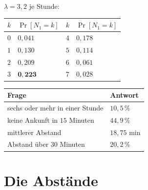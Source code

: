\begin{merksatz}
$\lambda = 3{,}2$ je Stunde:

\begin{center}
{\small
\renewcommand{\arraystretch}{1.46}
\begin{tabular}{@{}P{1.6cm}P{2.2cm}P{1.6cm}P{2.2cm}@{}}
\toprule
$k$ & $\Pr[N_1 = k]$ & $k$ & $\Pr[N_1 = k]$\\
\midrule
$0$ & $0{,}041$ & $4$ & $0{,}178$\\
$1$ & $0{,}130$ & $5$ & $0{,}114$\\
$2$ & $0{,}209$ & $6$ & $0{,}061$\\
$3$ & $\mathbf{0{,}223}$ & $7$ & $0{,}028$\\
\bottomrule
\end{tabular}}
\end{center}

\begin{center}
{\small
\renewcommand{\arraystretch}{1.5}
\begin{tabular}{@{}P{3.6cm}P{2.4cm}@{}}
\toprule
\textbf{Frage} & \textbf{Antwort}\\
\midrule
sechs oder mehr in einer Stunde & $10{,}5\,\%$\\
keine Ankunft in $15$ Minuten & $44{,}9\,\%$\\
mittlerer Abstand & $18{,}75$ min\\
Abstand über $30$ Minuten & $20{,}2\,\%$\\
\bottomrule
\end{tabular}}
\end{center}

\begin{center}
\begin{minipage}{0.88\textwidth}
\end{minipage}
\end{center}
\end{merksatz}

\section{Die Abstände}

